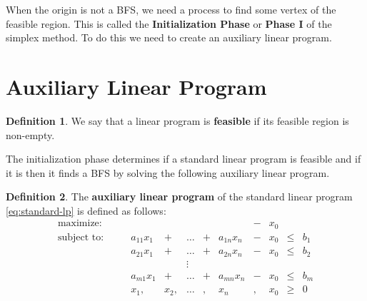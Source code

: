 \documentclass[
]{book}
\theoremstyle{definition}
\newtheorem{definition}{Definition}[chapter]
\theoremstyle{definition}
\theoremstyle{definition}
\theoremstyle{definition}
\theoremstyle{remark}
\begin{document}
When the origin is not a BFS, we need a process to find some vertex of the feasible region.
This is called the \textbf{Initialization Phase} or \textbf{Phase I} of the simplex method.
To do this we need to create an auxiliary linear program.

\hypertarget{auxiliary-linear-program}{%
\section{Auxiliary Linear Program}\label{auxiliary-linear-program}}

\begin{definition}
We say that a linear program is \textbf{feasible} if its feasible region is non-empty.
\end{definition}

The initialization phase determines if a standard linear program is feasible and if it is then it finds a BFS by solving the following auxiliary linear program.

\begin{definition}
The \textbf{auxiliary linear program} of the standard linear program \eqref{eq:standard-lp} is defined as follows:
\begin{equation}
  \begin{array}{lrrrrrrrrrrr}
    \mbox{maximize: } &  &  &   &  & &  & & - & x_0 & \\
    \mbox{subject to: } 
      & & & a_{11} x_1 & + & \dots & + & a_{1n} x_n & - &x_0 & \leq & b_1 \\
      & & & a_{21} x_1 & + & \dots & + & a_{2n} x_n & - &x_0 & \leq & b_2 \\
      & & & & & \vdots &  \\
      & & & a_{m1} x_1 & + & \dots & + & a_{mn} x_n & - &x_0 & \leq & b_m \\
      & & & x_1, & x_2, & \dots &, & x_n & , & x_0 & \geq & 0
  \end{array} 
  \label{eq:auxiliary-lp}
\end{equation}
\end{definition}
\end{document}
